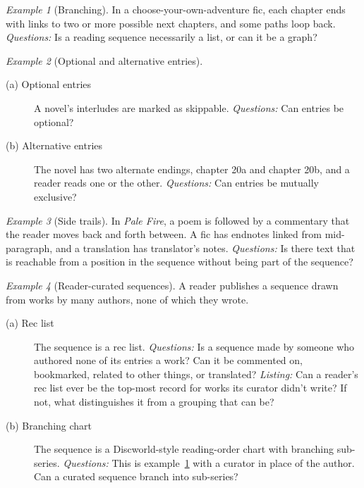 \documentclass{amsart}
\theoremstyle{remark}
\newtheorem{eg}{Example}
\begin{document}
    \begin{eg}[Branching]\label{eg:cyoa}
        In a choose-your-own-adventure fic, each chapter ends with links to two or more possible next chapters, and some paths loop back.
        \emph{Questions:} Is a reading sequence necessarily a list, or can it be a graph?
    \end{eg}
    \begin{eg}[Optional and alternative entries]\label{eg:optional}
        \begin{description}
          \item[(a) Optional entries] A novel's interludes are marked as skippable.
          \emph{Questions:} Can entries be optional?
          \item[(b) Alternative entries] The novel has two alternate endings, chapter 20a and chapter 20b, and a reader reads one or the other.
          \emph{Questions:} Can entries be mutually exclusive?
        \end{description}
    \end{eg}
    \begin{eg}[Side trails]\label{eg:side-trails}
        In \textit{Pale Fire}, a poem is followed by a commentary that the reader moves back and forth between. A fic has endnotes linked from mid-paragraph, and a translation has translator's notes.
        \emph{Questions:} Is there text that is reachable from a position in the sequence without being part of the sequence?
    \end{eg}
    \begin{eg}[Reader-curated sequences]\label{eg:rec-list}
        A reader publishes a sequence drawn from works by many authors, none of which they wrote.
        \begin{description}
          \item[(a) Rec list] The sequence is a rec list.
          \emph{Questions:} Is a sequence made by someone who authored none of its entries a work? Can it be commented on, bookmarked, related to other things, or translated?
          \emph{Listing:} Can a reader's rec list ever be the top-most record for works its curator didn't write? If not, what distinguishes it from a grouping that can be?
          \item[(b) Branching chart] The sequence is a Discworld-style reading-order chart with branching sub-series.
          \emph{Questions:} This is example~\ref{eg:cyoa} with a curator in place of the author. Can a curated sequence branch into sub-series?
        \end{description}
    \end{eg}
\end{document}
